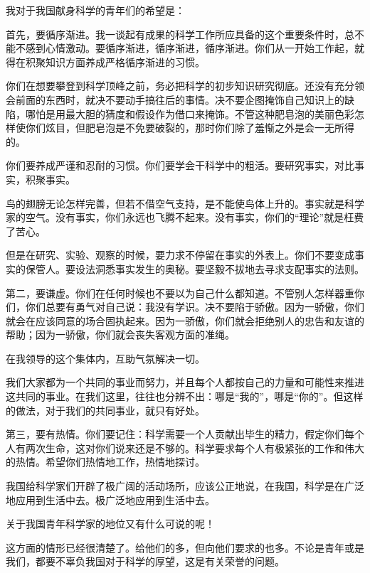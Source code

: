 \documentclass[12pt,UTF-8,openany]{ctexbook}
\begin{document}
\begin{large}
    
    我对于我国献身科学的青年们的希望是：
    
    首先，要循序渐进。我一谈起有成果的科学工作所应具备的这个重要条件时，总不能不感到心情激动。要循序渐进，循序渐进，循序渐进。你们从一开始工作起，就得在积聚知识方面养成严格循序渐进的习惯。
    
    你们在想要攀登到科学顶峰之前，务必把科学的初步知识研究彻底。还没有充分领会前面的东西时，就决不要动手搞往后的事情。决不要企图掩饰自己知识上的缺陷，哪怕是用最大胆的猜度和假设作为借口来掩饰。不管这种肥皂泡的美丽色彩怎样使你们炫目，但肥皂泡是不免要破裂的，那时你们除了羞惭之外是会一无所得的。
    
    你们要养成严谨和忍耐的习惯。你们要学会干科学中的粗活。要研究事实，对比事实，积聚事实。
    
    鸟的翅膀无论怎样完善，但若不借空气支持，是不能使鸟体上升的。事实就是科学家的空气。没有事实，你们永远也飞腾不起来。没有事实，你们的“理论”就是枉费了苦心。
    
    但是在研究、实验、观察的时候，要力求不停留在事实的外表上。你们不要变成事实的保管人。要设法洞悉事实发生的奥秘。要坚毅不拔地去寻求支配事实的法则。
    
    第二，要谦虚。你们在任何时候也不要以为自己什么都知道。不管别人怎样器重你们，你们总要有勇气对自己说：我没有学识。决不要陷于骄傲。因为一骄傲，你们就会在应该同意的场合固执起来。因为一骄傲，你们就会拒绝别人的忠告和友谊的帮助；因为一骄傲，你们就会丧失客观方面的准绳。
    
    在我领导的这个集体内，互助气氛解决一切。
    
    我们大家都为一个共同的事业而努力，并且每个人都按自己的力量和可能性来推进这共同的事业。在我们这里，往往也分辨不出：哪是“我的”，哪是“你的”。但这样的做法，对于我们的共同事业，就只有好处。
    
    第三，要有热情。你们要记住：科学需要一个人贡献出毕生的精力，假定你们每个人有两次生命，这对你们说来还是不够的。科学要求每个人有极紧张的工作和伟大的热情。希望你们热情地工作，热情地探讨。
    
    我国给科学家们开辟了极广阔的活动场所，应该公正地说，在我国，科学是在广泛地应用到生活中去。极广泛地应用到生活中去。
    
    关于我国青年科学家的地位又有什么可说的呢！
    
    这方面的情形已经很清楚了。给他们的多，但向他们要求的也多。不论是青年或是我们，都要不辜负我国对于科学的厚望，这是有关荣誉的问题。
    
\end{large}
\end{document}
